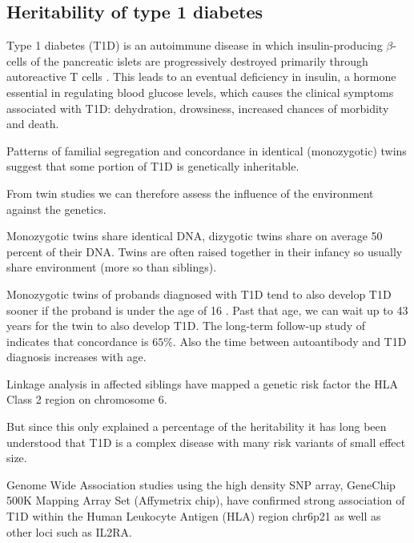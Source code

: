 

\subsection*{Heritability of type 1 diabetes}

Type 1 diabetes (T1D) is an autoimmune disease in which insulin-producing $\beta$-cells of the pancreatic islets are progressively destroyed primarily through autoreactive T cells \citep{Todd:2010bl}.
This leads to an eventual deficiency in insulin, a hormone essential in regulating blood glucose levels, which causes the clinical symptoms associated with T1D:
dehydration, drowsiness, increased chances of morbidity and death.


Patterns of familial segregation and concordance in identical (monozygotic) twins suggest that some portion of T1D is genetically inheritable.

From twin studies we can therefore assess the influence of the environment against the genetics.

Monozygotic twins share identical DNA, dizygotic twins share on average 50 percent of their DNA.
Twins are often raised together in their infancy so usually share environment (more so than siblings).


Monozygotic twins of probands diagnosed with T1D tend to also develop T1D sooner if the proband is under the age of 16 \citep{Redondo:2008}.
Past that age, we can wait up to 43 years for the twin to also develop T1D.
The long-term follow-up study of \citet{Redondo:2008} indicates that concordance is $65\%$.
Also the time between autoantibody and T1D diagnosis increases with age.


Linkage analysis in affected siblings have mapped a genetic risk factor the HLA Class 2 region on chromosome 6.

But since this only explained a percentage of the heritability it has long been understood that T1D is a complex disease with many risk variants of small effect size.

Genome Wide Association studies using the high density SNP array, GeneChip 500K Mapping Array Set (Affymetrix chip),
have confirmed strong association of T1D within the Human Leukocyte Antigen (HLA) region chr6p21 as well as other loci such as IL2RA.


